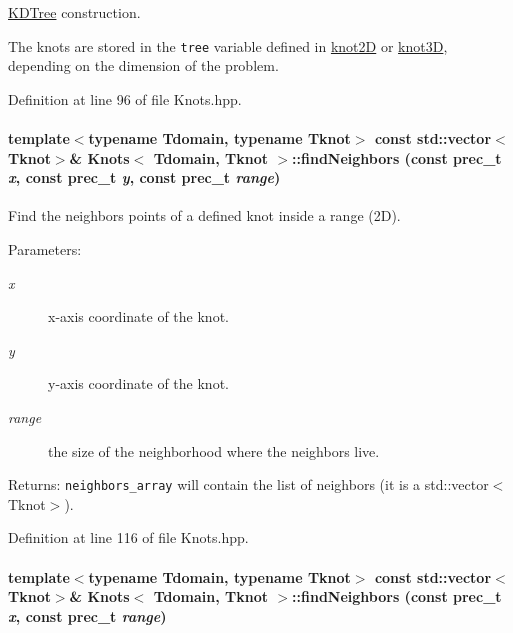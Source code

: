 \hyperlink{namespaceKDTree}{KDTree} construction. 

The knots are stored in the {\tt tree} variable defined in \hyperlink{structknot2D}{knot2D} or \hyperlink{structknot3D}{knot3D}, depending on the dimension of the problem. 

Definition at line 96 of file Knots.hpp.\hypertarget{classKnots_dd136cbe2ce6474885aab4829576472b}{
\paragraph[{findNeighbors}]{\setlength{\rightskip}{0pt plus 5cm}template$<$typename Tdomain, typename Tknot$>$ const std::vector$<$Tknot$>$\& {\bf Knots}$<$ Tdomain, Tknot $>$::findNeighbors (const {\bf prec\_\-t} {\em x}, \/  const {\bf prec\_\-t} {\em y}, \/  const {\bf prec\_\-t} {\em range})}\hfill}
\label{classKnots_dd136cbe2ce6474885aab4829576472b}


Find the neighbors points of a defined knot inside a range (2D). 

\begin{Desc}
\item[Parameters:]
\begin{description}
\item[{\em x}]x-axis coordinate of the knot. \item[{\em y}]y-axis coordinate of the knot. \item[{\em range}]the size of the neighborhood where the neighbors live. \end{description}
\end{Desc}
\begin{Desc}
\item[Returns:]{\tt neighbors\_\-array} will contain the list of neighbors (it is a std::vector$<$Tknot$>$). \end{Desc}


Definition at line 116 of file Knots.hpp.\hypertarget{classKnots_87739b3b70c0d10ae548ae1d1d0bdbe6}{
\paragraph[{findNeighbors}]{\setlength{\rightskip}{0pt plus 5cm}template$<$typename Tdomain, typename Tknot$>$ const std::vector$<$Tknot$>$\& {\bf Knots}$<$ Tdomain, Tknot $>$::findNeighbors (const {\bf prec\_\-t} {\em x}, \/  const {\bf prec\_\-t} {\em range})}\hfill}
\label{classKnots_87739b3b70c0d10ae548ae1d1d0bdbe6}


